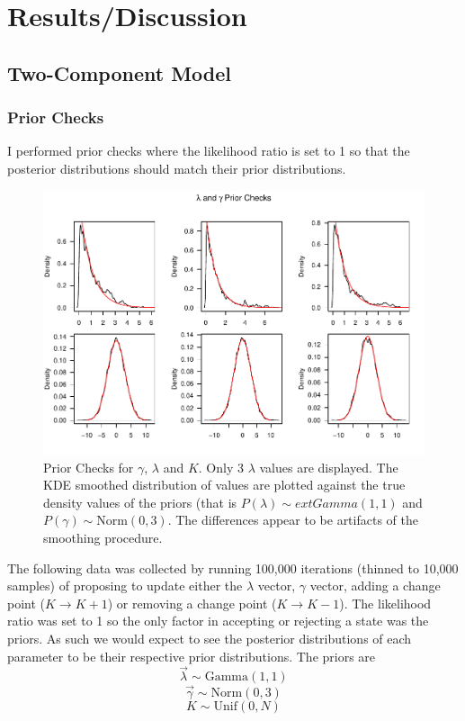 \documentclass[11pt,a4paper]{article}
\numberwithin{equation}{section}
\begin{document}
\hypertarget{resultsdiscussion}{%
\section{Results/Discussion}\label{resultsdiscussion}}

\hypertarget{two-component-model}{%
\subsection{Two-Component Model}\label{two-component-model}}

\hypertarget{prior-checks-1}{%
\subsubsection{Prior Checks}\label{prior-checks-1}}

I performed prior checks where the likelihood ratio is set to 1 so that
the posterior distributions should match their prior distributions.

\begin{figure}
\centering
\includegraphics{thesis_draft_files/figure-latex/prior_checks_2c-1.pdf}
\caption{\label{fig:pc2c}  Prior Checks for \(\gamma\), \(\lambda\) and
\(K\). Only 3 \(\lambda\) values are displayed. The KDE smoothed
distribution of values are plotted against the true density values of
the priors (that is \(P(\lambda) \sim ext{Gamma}(1,1)\) and
\(P(\gamma) \sim \text{Norm}(0,3)\). The differences appear to be
artifacts of the smoothing procedure.}
\end{figure}

The following data was collected by running 100,000 iterations (thinned
to 10,000 samples) of proposing to update either the \(\lambda\) vector,
\(\gamma\) vector, adding a change point (\(K \rightarrow K + 1\)) or
removing a change point (\(K \rightarrow K - 1\)). The likelihood ratio
was set to 1 so the only factor in accepting or rejecting a state was
the priors. As such we would expect to see the posterior distributions
of each parameter to be their respective prior distributions. The priors
are \[\vec\lambda \sim \text{Gamma}(1,1)\]
\[\vec\gamma \sim \text{Norm}(0,3)\] \[K \sim \text{Unif}(0,N)\]
\end{document}
